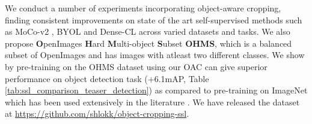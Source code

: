 We conduct a number of experiments incorporating object-aware cropping, finding consistent improvements on state of the art self-supervised methods such as MoCo-v2 \cite{chen2020improved}, BYOL \cite{grill2020bootstrap} and Dense-CL \cite{wang2021dense} across varied datasets and tasks. 
We also propose \textbf{O}penImages \textbf{H}ard \textbf{M}ulti-object \textbf{S}ubset \textbf{OHMS}, which is a balanced subset of OpenImages and has images with atleast two different classes.
We show by pre-training on the OHMS dataset using our OAC can give superior performance on object detection task (+6.1mAP, Table \ref{tab:ssl_comparison_teaser_detection}) as compared to pre-training on ImageNet which has been used extensively in the literature \cite{he2019momentum,chen2020simple,Caron2020UnsupervisedLO}. 
We have released the dataset at \url{https://github.com/shlokk/object-cropping-ssl}.



    

 
 
  
   
